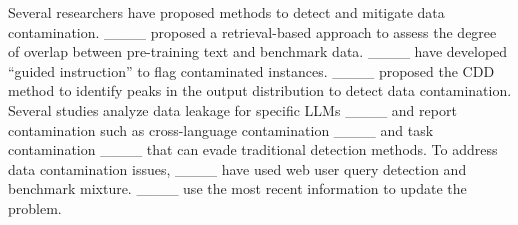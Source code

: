 Several researchers have proposed methods to detect and mitigate data contamination. ____ proposed a retrieval-based approach to assess the degree of overlap between pre-training text and benchmark data. ____ have developed ``guided instruction'' to flag contaminated instances. ____ proposed the CDD method to identify peaks in the output distribution to detect data contamination. Several studies analyze data leakage for specific LLMs ____ and report contamination such as cross-language contamination ____ and task contamination ____ that can evade traditional detection methods. To address data contamination issues, ____ have used web user query detection and benchmark mixture. ____ use the most recent information to update the problem.

